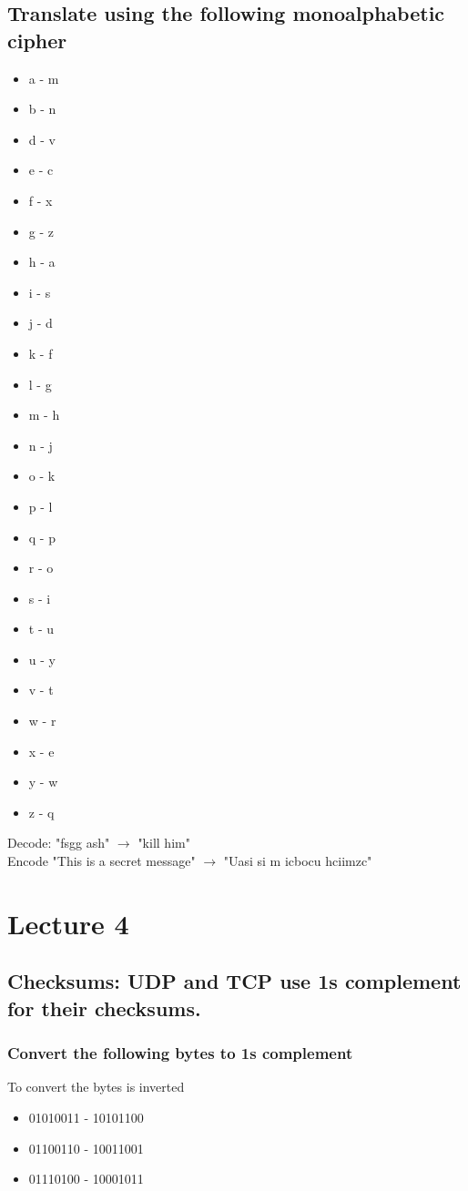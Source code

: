 \documentclass[12pt, a4paper]{article}
\begin{document}
		\subsection{Translate using the following monoalphabetic cipher}
			\begin{itemize}
				\item a - m
				\item b - n
				\item d - v
				\item e - c
				\item f - x
				\item g - z
				\item h - a
				\item i - s
				\item j - d
				\item k - f
				\item l - g
				\item m - h
				\item n - j
				\item o - k
				\item p - l
				\item q - p
				\item r - o
				\item s - i
				\item t - u
				\item u - y
				\item v - t
				\item w - r
				\item x - e
				\item y - w
				\item z - q
			\end{itemize}
			Decode: "fsgg ash" $\rightarrow$ "kill him"\\
			Encode "This is a secret message" $\rightarrow$ "Uasi si m icbocu hciimzc"
	\section{Lecture 4}
		\subsection{Checksums: UDP and TCP use 1s complement for their checksums.}
			\subsubsection{Convert the following bytes to 1s complement}
				To convert the bytes is inverted
				\begin{itemize}
					\item 01010011 - 10101100
					\item 01100110 - 10011001
					\item 01110100 - 10001011
				\end{itemize}
\end{document}
